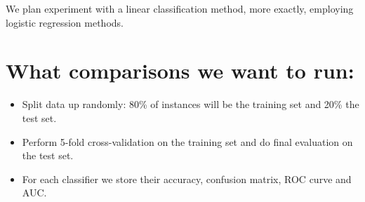\documentclass[a4paper,11pt]{article}
\begin{document}
We plan experiment with a linear classification method, more exactly, employing logistic regression methods. 

\section*{What comparisons we want to run:}
\begin{itemize}
	\item Split data up randomly: 80\% of instances will be the training set and 20\% the test set.
	\item Perform 5-fold cross-validation on the training set and do final evaluation on the test set.
	\item For each classifier we store their accuracy, confusion matrix, ROC curve and AUC.
\end{itemize}
\end{document}
